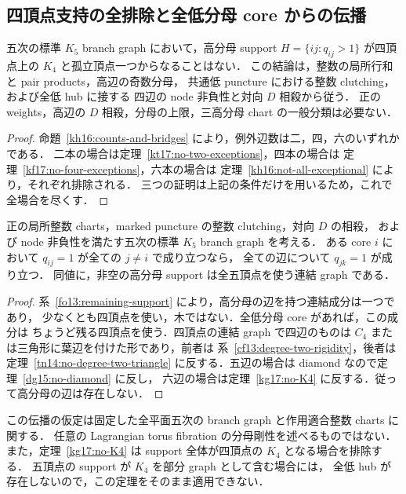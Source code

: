 \subsection{四頂点支持の全排除と全低分母 core からの伝播}
\label{kg17:section}

\begin{theorem}
\label{kg17:no-K4}
五次の標準 $K_5$ branch graph において，高分母 support
$H=\{ij:q_{ij}>1\}$ が四頂点上の $K_4$ と孤立頂点一つからなることはない．
この結論は，整数の局所行和と pair products，高辺の奇数分母，
共通低 puncture における整数 clutching，および全低 hub に接する
四辺の node 非負性と対向 $D$ 相殺から従う．
正の weights，高辺の $D$ 相殺，分母の上限，三高分母 chart の一般分類は必要ない．
\end{theorem}

\begin{proof}
命題~\ref{kh16:counts-and-bridges} により，例外辺数は二，四，六のいずれかである．
二本の場合は定理~\ref{kt17:no-two-exceptions}，四本の場合は
定理~\ref{kf17:no-four-exceptions}，六本の場合は
定理~\ref{kh16:not-all-exceptional} により，それぞれ排除される．
三つの証明は上記の条件だけを用いるため，これで全場合を尽くす．
\end{proof}

\begin{corollary}
\label{kg17:low-core-propagation}
正の局所整数 charts，marked puncture の整数 clutching，対向 $D$ の相殺，
および node 非負性を満たす五次の標準 $K_5$ branch graph を考える．
ある core $i$ において $q_{ij}=1$ が全ての $j\ne i$ で成り立つなら，
全ての辺について $q_{jk}=1$ が成り立つ．
同値に，非空の高分母 support は全五頂点を使う連結 graph である．
\end{corollary}

\begin{proof}
系~\ref{fo13:remaining-support} により，高分母の辺を持つ連結成分は一つであり，
少なくとも四頂点を使い，木ではない．全低分母 core があれば，この成分は
ちょうど残る四頂点を使う．四頂点の連結 graph で四辺のものは
$C_4$ または三角形に葉辺を付けた形であり，前者は
系~\ref{cf13:degree-two-rigidity}，後者は定理~\ref{tn14:no-degree-two-triangle}
に反する．五辺の場合は diamond なので定理~\ref{dg15:no-diamond} に反し，
六辺の場合は定理~\ref{kg17:no-K4} に反する．従って高分母の辺は存在しない．
\end{proof}

この伝播の仮定は固定した全平面五次の branch graph と作用適合整数 charts に関する．
任意の Lagrangian torus fibration の分母剛性を述べるものではない．
また，定理~\ref{kg17:no-K4} は support 全体が四頂点の $K_4$ となる場合を排除する．
五頂点の support が $K_4$ を部分 graph として含む場合には，
全低 hub が存在しないので，この定理をそのまま適用できない．
